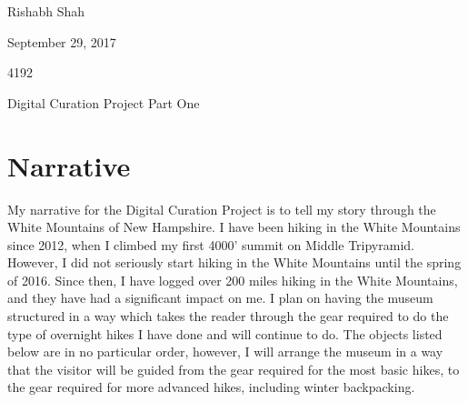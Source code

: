 \documentclass[10pt]{article}
\begin{document}
{\large \noindent Rishabh Shah

\noindent September 29, 2017

 4192

\noindent Digital Curation Project Part One}

\section*{Narrative}

My narrative for the Digital Curation Project is to tell my story through the White Mountains of New Hampshire. I have been hiking in the White Mountains since 2012, when I climbed my first 4000' summit on Middle Tripyramid. However, I did not seriously start hiking in the White Mountains until the spring of 2016. Since then, I have logged over 200 miles hiking in the White Mountains, and they have had a significant impact on me. I plan on having the museum structured in a way which takes the reader through the gear required to do the type of overnight hikes I have done and will continue to do. The objects listed below are in no particular order, however, I will arrange the museum in a way that the visitor will be guided from the gear required for the most basic hikes, to the gear required for more advanced hikes, including winter backpacking.
\end{document}
